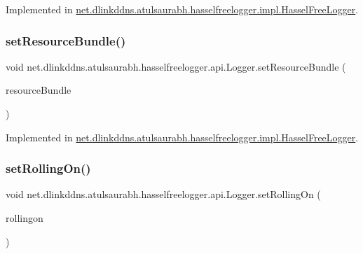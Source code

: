 Implemented in \mbox{\hyperlink{classnet_1_1dlinkddns_1_1atulsaurabh_1_1hasselfreelogger_1_1impl_1_1_hassel_free_logger_a72529568d69eea543b2238a466cedf8d}{net.\+dlinkddns.\+atulsaurabh.\+hasselfreelogger.\+impl.\+Hassel\+Free\+Logger}}.

\mbox{\label{interfacenet_1_1dlinkddns_1_1atulsaurabh_1_1hasselfreelogger_1_1api_1_1_logger_ad230d0cc0820137da2e5842b3c850f10}} 
\subsubsection{\texorpdfstring{set\+Resource\+Bundle()}{setResourceBundle()}}
{\footnotesize\ttfamily void net.\+dlinkddns.\+atulsaurabh.\+hasselfreelogger.\+api.\+Logger.\+set\+Resource\+Bundle (\begin{DoxyParamCaption}\item[{Resource\+Bundle}]{resource\+Bundle }\end{DoxyParamCaption})}



Implemented in \mbox{\hyperlink{classnet_1_1dlinkddns_1_1atulsaurabh_1_1hasselfreelogger_1_1impl_1_1_hassel_free_logger_a33f376ecfd8258b672cdfb93514c14b0}{net.\+dlinkddns.\+atulsaurabh.\+hasselfreelogger.\+impl.\+Hassel\+Free\+Logger}}.

\mbox{\label{interfacenet_1_1dlinkddns_1_1atulsaurabh_1_1hasselfreelogger_1_1api_1_1_logger_a2f15f4d94258528efb2938323deb8135}} 
\subsubsection{\texorpdfstring{set\+Rolling\+On()}{setRollingOn()}}
{\footnotesize\ttfamily void net.\+dlinkddns.\+atulsaurabh.\+hasselfreelogger.\+api.\+Logger.\+set\+Rolling\+On (\begin{DoxyParamCaption}\item[{boolean}]{rollingon }\end{DoxyParamCaption})}


